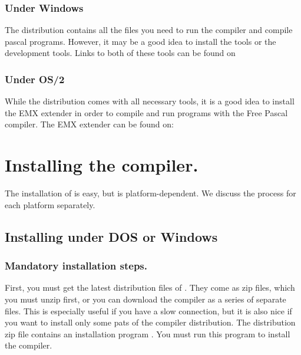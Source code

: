 \documentclass{book}
\begin{document}
\subsubsection{Under Windows}
The \windows distribution contains all the files you need to run the compiler
and compile pascal programs. However, it may be a good idea to install
the  tools or the  development tools. Links
to both of these tools can be found on 

\subsubsection{Under OS/2}
While the \fpc distribution comes with all necessary tools, it is a good
idea to install the EMX extender in order to compile and run
programs with the Free Pascal compiler. The EMX extender can be found on:\\

\section{Installing the compiler.}
The installation of \fpc is easy, but is platform-dependent.
We discuss the process for each platform separately.

\subsection{Installing under DOS or Windows}
\subsubsection{Mandatory installation steps.}
First, you must get the latest distribution files of \fpc. They come as zip
files, which you must unzip first, or you can download the compiler as a
series of separate files. This is especially useful if you have a slow
connection, but it is also nice if you want to install only some pats of the
compiler distribution.  The distribution zip file contains an
installation program . You must run this program to install
the compiler.
\end{document}

